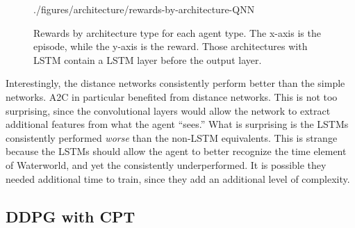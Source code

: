 \begin{figure}[!ht]
    {./figures/architecture/rewards-by-architecture-QNN}
    \caption{
        Rewards by architecture type for each agent type.
        The x-axis is the episode, while the y-axis is the reward.
        Those architectures with LSTM contain a LSTM layer before the output layer.
    }
    \label{fig:rewards-by-architecture}
\end{figure}

Interestingly, the distance networks consistently perform better than the simple
networks.
A2C in particular benefited from distance networks.
This is not too surprising, since the convolutional layers would allow the network to
extract additional features from what the agent ``sees.''
What is surprising is the LSTMs consistently performed \textit{worse} than the
non-LSTM equivalents.
This is strange because the LSTMs should allow the agent to better recognize the time
element of Waterworld, and yet the consistently underperformed.
It is possible they needed additional time to train, since they add an additional
level of complexity.

\subsection{DDPG with CPT}\label{subsec:ddpg-with-cpt}
